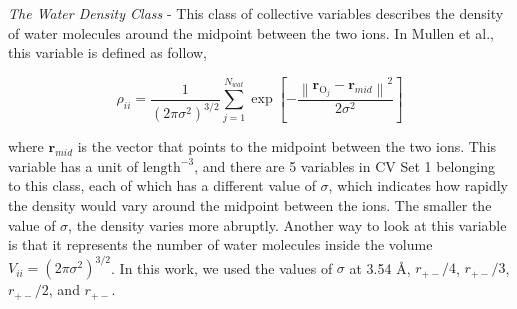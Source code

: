 \begin{spacing}{2.0}
    \textsl{The Water Density Class} - This class of collective variables describes the density of water molecules around the midpoint between
    the two ions. In Mullen et al., this variable is defined as follow,

    \begin{equation}
        \rho_{ii} = \frac{1}{(2\pi\sigma^2)^{3/2}}\sum_{j=1}^{N_{wat}}\exp\left[-\frac{\left\lVert \mathbf{r}_{\mathrm{O}_j} - \mathbf{r}_{mid} \right\rVert^2}
            {2\sigma^2}\right]
    \end{equation}

    \noindent where $\mathbf{r}_{mid}$ is the vector that points to the midpoint between the two ions. This variable has a unit of $\mathrm{length}^{-3}$, and
    there are 5 variables in CV Set 1 belonging to this class, each of which has a different value of $\sigma$, which indicates how rapidly the density would
    vary around the midpoint between the ions. The smaller the value of $\sigma$, the density varies more abruptly. Another way to look at this variable is
    that it represents the number of water molecules inside the volume $V_{ii} = \left(2\pi\sigma^2\right)^{3/2}$. In this work, we used the values of $\sigma$
    at 3.54 \r{A}, $r_{+-}/4$, $r_{+-}/3$, $r_{+-}/2$, and $r_{+-}$. 
\end{spacing}
